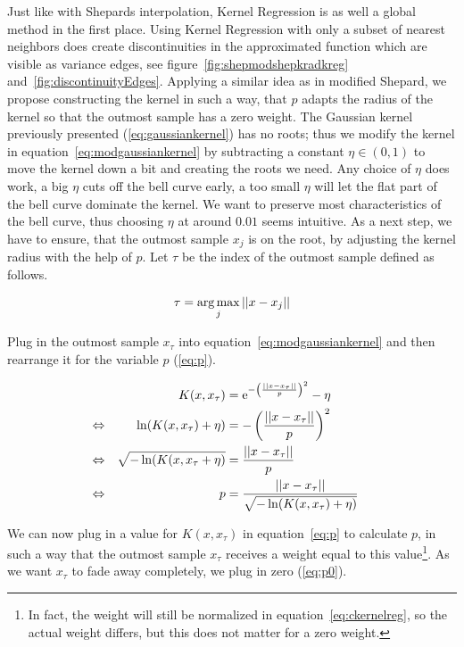 Just like with Shepards interpolation, Kernel Regression is as well a global method in the first place. Using Kernel Regression with only a subset of nearest neighbors does create discontinuities in the approximated function which are visible as variance edges, see figure~\ref{fig:shepmodshepkradkreg} and~\ref{fig:discontinuityEdges}. Applying a similar idea as in modified Shepard, we propose constructing the kernel in such a way, that $p$ adapts the radius of the kernel so that the outmost sample has a zero weight. The Gaussian kernel previously presented (\ref{eq:gaussiankernel}) has no roots; thus we modify the kernel in equation~\ref{eq:modgaussiankernel} by subtracting a constant $\eta \in (0,1)$ to move the kernel down a bit and creating the roots we need. %
Any choice of $\eta$ does work, a big $\eta$ cuts off the bell curve early, a too small $\eta$ will let the flat part of the bell curve dominate the kernel. We want to preserve most characteristics of the bell curve, thus choosing $\eta$ at around $0.01$ seems intuitive.  As a next step, we have to ensure, that the outmost sample $x_j$ is on the root, by adjusting the kernel radius with the help of $p$. Let $\tau$ be the index of the outmost sample defined as follows. 

\begin{align}
\label{eq:tau}
\tau = \operatorname*{arg\,max}_j ||x - x_j||
\end{align}

Plug in the outmost sample $x_\tau$ into equation~\ref{eq:modgaussiankernel} and then rearrange it for the variable $p$ (\ref{eq:p}). 

\begin{align}
&&K(x, x_\tau)&=\mathrm{e}^{-\left(\frac{||x-x_\tau||}{p}\right)^2} - \eta \label{eq:modgaussiankernel} &&\\
\Leftrightarrow&&\ln(K(x, x_\tau) + \eta) &= -\left(\frac{||x-x_\tau||}{p}\right)^2 \notag &&\\
\Leftrightarrow&& \sqrt{-\ln(K(x, x_\tau + \eta)} &= \frac{||x-x_\tau||}{p} \notag &&\\
\Leftrightarrow&& p &= \frac{||x-x_\tau||}{\sqrt{-\ln(K(x, x_\tau) + \eta)}} \label{eq:p}&&
\end{align}

We can now plug in a value for $K(x, x_\tau)$ in equation~\ref{eq:p} to calculate $p$, in such a way that the outmost sample $x_\tau$ receives a weight equal to this value\footnote{In fact, the weight will still be normalized in equation~\ref{eq:ckernelreg}, so the actual weight differs, but this does not matter for a zero weight.}. As we want $x_\tau$ to fade away completely, we plug in zero (\ref{eq:p0}).

